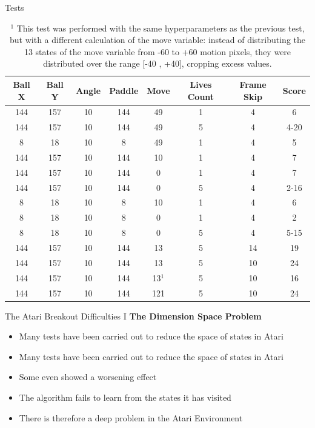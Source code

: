 \begin{frame}{Tests}
\begin{small}
	\begin{table}[h]
		\centering
		\begin{tabular}{*{8}{c}}
			Ball X & Ball Y & Angle & Paddle & Move & Lives Count & Frame Skip & Score \\
			\hline
			144 & 157 & 10 & 144 & 49 & 1 & 4 & 6 \\
			144 & 157 & 10 & 144 & 49 & 5 & 4 & 4-20 \\
			8 & 18 & 10 & 8 & 49 & 1 & 4 & 5 \\
			144 & 157 & 10 & 144 & 10 & 1 & 4 & 7 \\
			144 & 157 & 10 & 144 & 0 & 1 & 4 & 7 \\
			144 & 157 & 10 & 144 & 0 & 5 & 4 & 2-16 \\
			8 & 18 & 10 & 8 & 10 & 1 & 4 & 6 \\
			8 & 18 & 10 & 8 & 0 & 1 & 4 & 2 \\
			8 & 18 & 10 & 8 & 0 & 5 & 4 & 5-15 \\
			\hline
			144 & 157 & 10 & 144 & 13 & 5 & 14 & 19 \\
			144 & 157 & 10 & 144 & 13 & 5 & 10 & 24 \\
			144 & 157 & 10 & 144 & 13$^1$ & 5 & 10 & 16 \\
			144 & 157 & 10 & 144 & 121 & 5 & 10 & 24 \\
		\end{tabular}
		\caption{$^1$ This test was performed with the same hyperparameters as the previous test, but with a different calculation of the move variable: instead of distributing the 13 states of the move variable from -60 to +60 motion pixels, they were distributed over the range [-40 , +40], cropping excess values.}
	\end{table}
\end{small}
\end{frame}

\begin{frame}{The Atari Breakout Difficulties I}
\textbf{The Dimension Space Problem}
    \begin{itemize}
	\item Many tests have been carried out to reduce the space of states in Atari
	\item Many tests have been carried out to reduce the space of states in Atari
	\item Some even showed a worsening effect
	\item The algorithm fails to learn from the states it has visited
	\item There is therefore a deep problem in the Atari Environment
    \end{itemize}
\end{frame}


